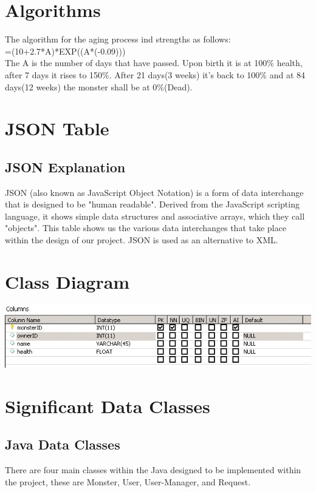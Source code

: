 \documentclass{project}
\begin{document}
\section{Algorithms}
The algorithm for the aging process ind strengths as follows:\\
=(10+2.7*A)*EXP((A*(-0.09)))\\
The A is the number of days that have passed. Upon birth it is at 100\% health, after 7 days it rises to 150\%. After 21 days(3 weeks) it's back to 100\% and at 84 days(12 weeks) the monster shall be at 0\%(Dead). 

\section{JSON Table}


\subsection{JSON Explanation}
JSON (also known as JavaScript Object Notation) is a form of data interchange that is designed to be "human readable". Derived from the JavaScript scripting language, it shows simple data structures and associative arrays, which they call "objects". This table shows us the various data interchanges that take place within the design of our project.  JSON is used as an alternative to XML.

\section{Class Diagram}
\includegraphics[scale=0.40]{MonsterDiagram.png}

\section{Significant Data Classes}
\subsection{Java Data Classes}
There are four main classes within the Java designed to be implemented within the project, these are Monster, User, User-Manager, and Request.
\end{document}
